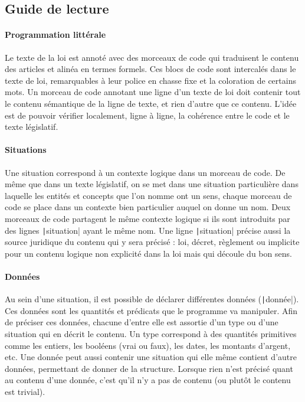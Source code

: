 \documentclass[11pt, french]{article}
\begin{document}
\subsection{Guide de lecture}

\paragraph{Programmation littérale} Le texte de la loi est annoté avec des morceaux de code qui traduisent le contenu des articles et alinéa en termes formels. Ces blocs de code sont intercalés dans le texte de loi, remarquables à leur police en chasse fixe et la coloration de certains mots. Un morceau de code annotant une ligne d'un texte de loi doit contenir tout le contenu sémantique de la ligne de texte, et rien d'autre que ce contenu. L'idée est de pouvoir vérifier localement, ligne à ligne, la cohérence entre le code et le texte législatif.

\paragraph{Situations} Une situation correspond à un contexte logique dans un morceau de code. De même que dans un texte législatif, on se met dans une situation particulière dans laquelle les entités et concepts que l'on nomme ont un sens, chaque morceau de code se place dans un contexte bien particulier auquel on donne un nom. Deux morceaux de code partagent le même contexte logique si ils sont introduits par des lignes \texttt|situation| ayant le même nom. Une ligne \texttt|situation| précise aussi la source juridique du contenu qui y sera précisé : loi, décret, règlement ou implicite pour un contenu logique non explicité dans la loi mais qui découle du bon sens.

\paragraph{Données} Au sein d'une situation, il est possible de déclarer différentes données (\texttt|donnée|). Ces données sont les quantités et prédicats que le programme va manipuler. Afin de préciser ces données, chacune d'entre elle est assortie d'un type ou d'une situation qui en décrit le contenu. Un type correspond à des quantités primitives comme les entiers, les booléens (vrai ou faux), les dates, les montants d'argent, etc. Une donnée peut aussi contenir une situation qui elle même contient d'autre données, permettant de donner de la structure. Lorsque rien n'est précisé quant au contenu d'une donnée, c'est qu'il n'y a pas de contenu (ou plutôt le contenu est trivial).
\end{document}
